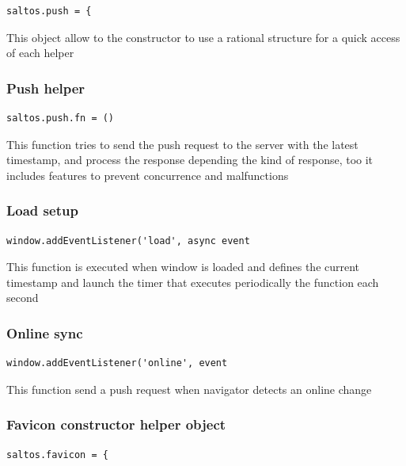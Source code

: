 \documentclass[a4paper]{article}
\begin{document}
\begin{lstlisting}
saltos.push = {
\end{lstlisting}

This object allow to the constructor to use a rational structure for a quick access of each
helper

\hypertarget{toc279}{}
\subsubsection{Push helper}

\begin{lstlisting}
saltos.push.fn = ()
\end{lstlisting}

This function tries to send the push request to the server with the latest
timestamp, and process the response depending the kind of response, too it
includes features to prevent concurrence and malfunctions

\hypertarget{toc280}{}
\subsubsection{Load setup}

\begin{lstlisting}
window.addEventListener('load', async event
\end{lstlisting}

This function is executed when window is loaded and defines the current
timestamp and launch the timer that executes periodically the function
each second

\hypertarget{toc281}{}
\subsubsection{Online sync}

\begin{lstlisting}
window.addEventListener('online', event
\end{lstlisting}

This function send a push request when navigator detects an online change

\hypertarget{toc282}{}
\subsubsection{Favicon constructor helper object}

\begin{lstlisting}
saltos.favicon = {
\end{lstlisting}
\end{document}
